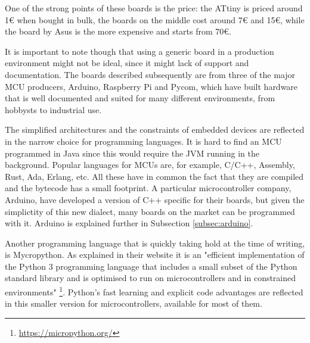 	One of the strong points of these boards is the price: the ATtiny is priced around 1€ when bought in bulk, the boards on the middle cost around 7€ and 15€, while the board by Asus is the more expensive and starts from 70€.
	
	It is important to note though that using a generic board in a production environment might not be ideal, since it might lack of support and documentation.
	The boards described subsequently are from three of the major MCU producers, Arduino, Raspberry Pi and Pycom, which have built hardware that is well documented and suited for many different environments, from hobbysts to industrial use.
	
	The simplified architectures and the constraints of embedded devices are reflected in the narrow choice for programming languages.
	It is hard to find an MCU programmed in Java since this would require the JVM running in the background.
	Popular languages for MCUs are, for example, C/C++, Assembly, Rust, Ada, Erlang, etc.
	All these have in common the fact that they are compiled and the bytecode has a small footprint.
	A particular microcontroller company, Arduino, have developed a version of C++ specific for their boards, but given the simplictity of this new dialect, many boards on the market can be programmed with it.
	Arduino is explained further in Subsection \ref{subsec:arduino}.

	Another programming language that is quickly taking hold at the time of writing, is Mycropython.
	As explained in their website it is an "efficient implementation of the Python 3 programming language that includes a small subset of the Python standard library and is optimised to run on microcontrollers and in constrained environments" \footnote{\url{https://micropython.org/}}.
	Python's fast learning and explicit code advantages are reflected in this smaller version for microcontrollers, available for most of them.
	
